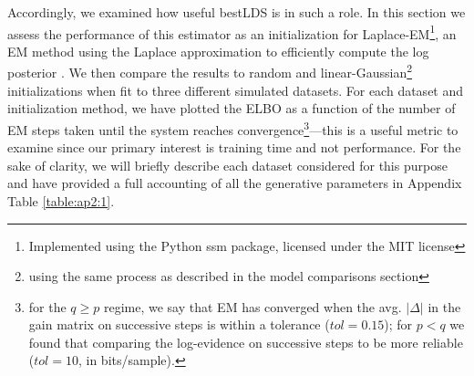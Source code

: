 Accordingly, we examined how useful bestLDS is in such a role. In this section we assess the performance of this estimator as an initialization for Laplace-EM\footnote{Implemented using the Python ssm package, licensed under the MIT license}, an EM method using the Laplace approximation to efficiently compute the log posterior \cite{smith_estimating_2003, kulkarni_common-input_2007, paninski_new_2010, yuan_estimating_2010}. We then compare the results to random and linear-Gaussian\footnote{using the same process as described in the model comparisons section} initializations when fit to three different simulated datasets. For each dataset and initialization method, we have plotted the ELBO as a function of the number of EM steps taken until the system reaches convergence\footnote{for the $q\geq p$ regime, we say that EM has converged when the avg. $|\Delta|$ in the gain matrix on successive steps is within a tolerance ($tol=0.15$); for $p<q$ we found that comparing the log-evidence on successive steps to be more reliable ($tol=10$, in bits/sample).}---this is a useful metric to examine since our primary interest is training time and not performance. For the sake of clarity, we will briefly describe each dataset considered for this purpose and have provided a full accounting of all the generative parameters in Appendix Table \ref{table:ap2:1}.

